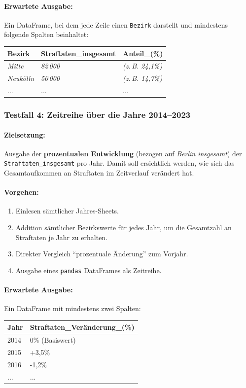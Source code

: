\documentclass[11pt,a4paper]{article}
\begin{document}
\paragraph{Erwartete Ausgabe:}
Ein DataFrame, bei dem jede Zeile einen \texttt{Bezirk} darstellt und mindestens folgende Spalten beinhaltet:
\begin{center}
\begin{tabular}{l|l|l}
\textbf{Bezirk} & \textbf{Straftaten\_insgesamt} & \textbf{Anteil\_(\%)} \\
\hline
\textit{Mitte} & \textit{82\,000} & \textit{(z.\,B. 24,1\%)} \\
\textit{Neukölln} & \textit{50\,000} & \textit{(z.\,B. 14,7\%)} \\
... & ... & ...
\end{tabular}
\end{center}

\subsubsection{Testfall 4: Zeitreihe über die Jahre 2014--2023}
\paragraph{Zielsetzung:}
Ausgabe der \textbf{prozentualen Entwicklung} (bezogen auf \emph{Berlin insgesamt}) der \texttt{Straftaten\_insgesamt} pro Jahr. Damit soll ersichtlich werden, wie sich das Gesamtaufkommen an Straftaten im Zeitverlauf verändert hat. 

\paragraph{Vorgehen:}
\begin{enumerate}
    \item Einlesen sämtlicher Jahres-Sheets.
    \item Addition sämtlicher Bezirkswerte für jedes Jahr, um die Gesamtzahl an Straftaten je Jahr zu erhalten.
    \item Direkter Vergleich \enquote{prozentuale Änderung} zum Vorjahr.
    \item Ausgabe eines \texttt{pandas} DataFrames als Zeitreihe.
\end{enumerate}

\paragraph{Erwartete Ausgabe:}
Ein DataFrame mit mindestens zwei Spalten:
\begin{center}
\begin{tabular}{l|l}
\textbf{Jahr} & \textbf{Straftaten\_Veränderung\_(\%)} \\
\hline
2014 & 0\% (Basiswert) \\
2015 & +3,5\% \\
2016 & -1,2\% \\
... & ...
\end{tabular}
\end{center}
\end{document}
